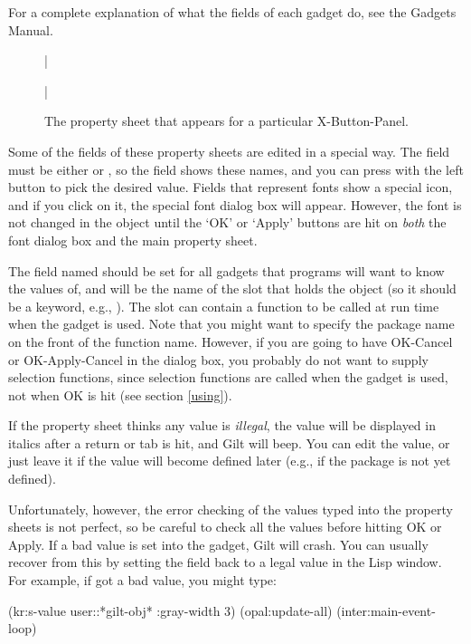 For a complete explanation of what the fields of each
gadget do, see the Gadgets Manual.

\begin{figure}
\bar{}
\begin{center}
\end{center}
\caption{The property sheet that appears for a particular X-Button-Panel.}
\bar{}
\end{figure}

Some of the fields of these property sheets are edited in a special way.  The
 field must be either  or , so
the field shows these names, and you can press with the left button to pick
the desired value.  Fields that represent fonts show a special icon,
and if you click on it, the special font dialog box will appear.
However, the font is not changed in the object until the `OK' or
`Apply' buttons are hit on {\it both} the font dialog box and the main
property sheet.

The field named  should be set for
all gadgets that programs will want to know the values of, and will be the
name of the slot that holds the object (so it should be a keyword, e.g.,
).  The  slot can contain a function to be
called at run time when the gadget is used.  Note that you might want to
specify the package name on the front of the function name.  However, if
you are going to have OK-Cancel or OK-Apply-Cancel in the dialog box, you
probably do not want to supply selection functions, since selection
functions are called when the gadget is used, not when OK is hit (see
section \ref{using}).

If the property sheet thinks any value is {\it illegal}, the value will
be displayed in italics after a return or tab is hit, and Gilt will
beep.  You can edit the value, or just leave it if the value will
become defined later (e.g., if the package is not yet defined).

Unfortunately, however, the error checking of the values typed into
the property sheets is not perfect, so be careful to check all the values
before hitting OK or Apply.  If a bad value is set into the gadget,
Gilt will crash.  You can usually recover from this by setting the
field back to a legal value in the Lisp window.  For example, if
 got a bad value, you might type:
\begin{programexample}
(kr:s-value user::*gilt-obj* :gray-width 3)
(opal:update-all)
(inter:main-event-loop)
\end{programexample}

